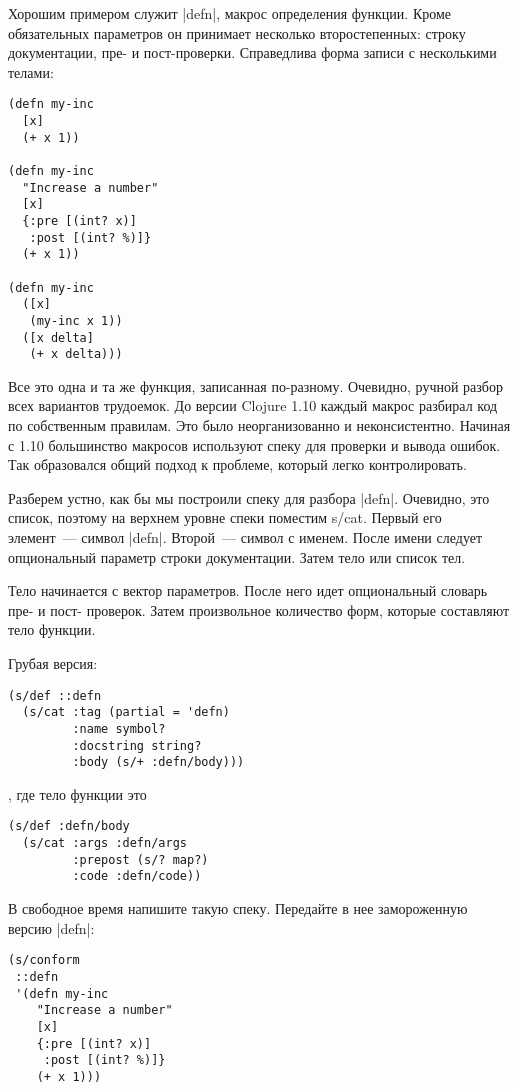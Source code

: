 Хорошим примером служит \spverb|defn|, макрос определения функции. Кроме обязательных
параметров он принимает несколько второстепенных: строку документации, пре- и
пост-проверки. Справедлива форма записи с несколькими телами:

\begin{verbatim}
(defn my-inc
  [x]
  (+ x 1))

(defn my-inc
  "Increase a number"
  [x]
  {:pre [(int? x)]
   :post [(int? %)]}
  (+ x 1))

(defn my-inc
  ([x]
   (my-inc x 1))
  ([x delta]
   (+ x delta)))
\end{verbatim}

Все это одна и та же функция, записанная по-разному. Очевидно, ручной разбор
всех вариантов трудоемок. До версии Clojure 1.10 каждый макрос разбирал код по
собственным правилам. Это было неорганизованно и неконсистентно. Начиная с 1.10
большинство макросов используют спеку для проверки и вывода ошибок. Так
образовался общий подход к проблеме, который легко контролировать.

Разберем устно, как бы мы построили спеку для разбора \spverb|defn|. Очевидно, это
список, поэтому на верхнем уровне спеки поместим s/cat. Первый его элемент~---
символ \spverb|defn|. Второй~--- символ с именем. После имени следует опциональный параметр
строки документации. Затем тело или список тел.

Тело начинается с вектор параметров. После него идет опциональный словарь пре- и
пост- проверок. Затем произвольное количество форм, которые составляют тело
функции.

Грубая версия:

\begin{verbatim}
(s/def ::defn
  (s/cat :tag (partial = 'defn)
         :name symbol?
         :docstring string?
         :body (s/+ :defn/body)))
\end{verbatim}

, где тело функции это

\begin{verbatim}
(s/def :defn/body
  (s/cat :args :defn/args
         :prepost (s/? map?)
         :code :defn/code))
\end{verbatim}

В свободное время напишите такую спеку. Передайте в нее замороженную версию
\spverb|defn|:

\begin{verbatim}
(s/conform
 ::defn
 '(defn my-inc
    "Increase a number"
    [x]
    {:pre [(int? x)]
     :post [(int? %)]}
    (+ x 1)))
\end{verbatim}

